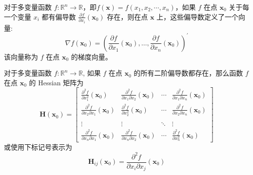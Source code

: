 \documentclass[cn,mtpro2,12pt]{elegantbook}
\begin{document}
\begin{definition}[梯度向量]
    对于多变量函数 $f:\mathbb{R}^{n}\rightarrow\mathbb{R}$，即$f(\mathbf{x})=f\left(x_{1},x_{2},\cdots,x_{n}\right)$，如果 $f$ 在点 $\mathbf{x}_{0}$ 关于每一个变量 $x_{i}$ 都有偏导数 $\frac{\partial f}{\partial x_{i}}(\mathbf{x}_{0})$ 存在，则在点 $\mathbf{x}$ 上，这些偏导数定义了一个向量:
    \begin{equation}
        \nabla f(\mathbf{x}_{0})=\left(\frac{\partial f}{\partial x_{1}}(\mathbf{x}_{0}),\ldots,\frac{\partial f}{\partial x_{n}}(\mathbf{x}_{0})\right)^{\prime}
    \end{equation}
    该向量称为 $f$ 在点 $\mathbf{x}_{0}$ 的梯度向量。
\end{definition}

\begin{definition}[Hessian 矩阵]
    对于多变量函数 $f:\mathbb{R}^{n}\rightarrow\mathbb{R}$, 如果 $f$ 在点 $\mathbf{x}_{0}$ 的所有二阶偏导数都存在，那么函数 $f$ 在点 $\mathbf{x}_{0}$ 的 Hessian 矩阵为
    \begin{equation}
        \boldsymbol{H}(\mathbf{x}_{0})=\left[\begin{array}{cccc}
                \frac{\partial^{2} f}{\partial x_{1}^{2}}(\mathbf{x}_{0})            & \frac{\partial^{2} f}{\partial x_{1} \partial x_{2}}(\mathbf{x}_{0}) & \cdots & \frac{\partial^{2} f}{\partial x_{1} \partial x_{n}}(\mathbf{x}_{0}) \\
                \frac{\partial^{2} f}{\partial x_{2} \partial x_{1}}(\mathbf{x}_{0}) & \frac{\partial^{2} f}{\partial x_{2}^{2}}(\mathbf{x}_{0})            & \cdots & \frac{\partial^{2} f}{\partial x_{2} \partial x_{n}}(\mathbf{x}_{0}) \\
                                                                                     &                                                                      &        &                                                                      \\
                \vdots                                                               & \vdots                                                               & \ddots & \vdots                                                               \\
                \frac{\partial^{2} f}{\partial x_{n} \partial x_{1}}(\mathbf{x}_{0}) & \frac{\partial^{2} f}{\partial x_{n} \partial x_{2}}(\mathbf{x}_{0}) & \cdots & \frac{\partial^{2} f}{\partial x_{n}^{2}}(\mathbf{x}_{0})
            \end{array}\right]
    \end{equation}
    或使用下标记号表示为
    \begin{equation}
        \boldsymbol{H}_{i j}(\mathbf{x}_{0})=\frac{\partial^{2} f}{\partial x_{i} \partial x_{j}}(\mathbf{x}_{0})
    \end{equation}
\end{definition}
\end{document}
